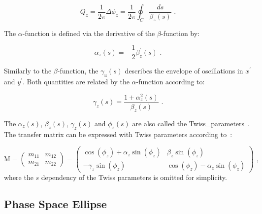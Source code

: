 \begin{equation}
    Q_z = \frac{1}{2 \pi} \Delta \phi_z = \frac{1}{2 \pi} \oint_C \dfrac{ds}{\beta_z (s)} \text{ .}
    \label{equation:tune_definition}
\end{equation}

The \(\alpha\)-function is defined via the derivative of the \(\beta\)-function by:

\begin{equation}
    \alpha_z(s) = - \frac{1}{2} \beta^{\prime}_z(s) \text{ .}
    \label{equation:alpha_function}
\end{equation}

Similarly to the \(\beta\)-function, the  \(\gamma_u(s)\) describes the envelope of oscillations in \(x^{\prime}\) and \(y^{\prime}\).
Both quantities are related by the \(\alpha\)-function according to:

\begin{equation}
    \gamma_z(s) = \frac{1 + \alpha_z^2(s)}{\beta_z(s)} \text{ .}
    \label{equation:gamma_function}
\end{equation}

The \(\alpha_z(s)\), \(\beta_z(s)\), \(\gamma_z(s)\) and \(\phi_z(s)\) are also called the \gls{Twiss_parameters}~\cite{RSI:Twiss:Orbital_Stability_Proton_Synchrotron}.
The transfer matrix can be expressed with Twiss parameters according to~\cite{AOP:COURANT:Theory_Alternating_Gradient_Synchrotron}:

\begin{equation}
    \mathrm{M} = 
    \left( 
    \begin{array}{ll}
        m_{11} & m_{12} \\
        m_{21} & m_{22}
    \end{array} \right) 
    = 
    \left(
    \begin{array}{cc}
        \cos \left( \phi_z \right) + \alpha_z \sin \left( \phi_z \right) & \beta_z \sin \left( \phi_z \right) \\
        - \gamma_z \sin \left( \phi_z \right)                            & \cos \left( \phi_z \right) - \alpha_z \sin \left( \phi_z \right)
    \end{array} 
    \right) \text{ ,}
    \label{equation:transfer_matrix_twiss_parameters}
\end{equation}
where the \(s\) dependency of the Twiss parameters is omitted for simplicity.

\subsection{Phase Space Ellipse}
\label{subsection:phase_space_ellipse}

